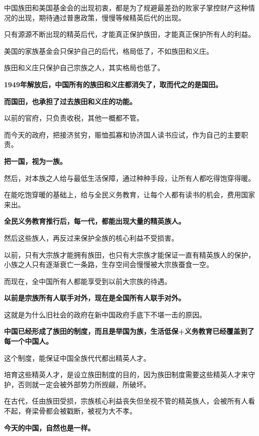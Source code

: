 \documentclass[UTF8, 11pt, oneside]{ctexart}
\newcommand{\zd}[1]{\textbf{\textcolor[RGB]{123,12,0}{#1}}} %
\begin{document}
中国族田和美国基金会的出现初衷，都是为了规避最差劲的败家子掌控财产这种情况的出现，期待通过普惠政策，慢慢等候精英后代的出现。

只有源源不断出现的精英后代，才能真正保护族田，才能真正保护所有人的利益。

美国的家族基金会只保护自己的后代，格局低了，不如族田和义庄。

族田和义庄只保护自己宗族之人，其实格局也低了。

\zd{1949年解放后，中国所有的族田和义庄都消失了，取而代之的是国田。}

\zd{而国田，也承担了过去族田和义庄的功能。}

以前的官府，只负责收税，其他一概都不管。

而今天的政府，把接济贫穷，赈恤孤寡和协济国人读书应试，作为自己的主要职责。

\zd{把一国，视为一族。}

然后，对本族之人给与最低生活保障，通过种种手段，让所有人都吃得饱穿得暖。

在能吃饱穿暖的基础上，给与全民义务教育，让每个人都有读书的机会，费用国家来出。

\zd{全民义务教育推行后，每一代，都能出现大量的精英族人。}

然后这些族人，再反过来保护全族的核心利益不受损害。

以前，只有大宗族才能拥有族田，也只有大宗族才能保证一直有精英族人的保护，小族之人只有逐渐衰亡一条路，生存空间会慢慢被大宗族蚕食一空。

而现在，全中国所有人都能享受到以前大宗族的待遇。

\zd{以前是宗族所有人联手对外，现在是全国所有人联手对外。}

这就是为什么旧社会的政府在新中国政府手底下不堪一击的原因。

\zd{中国已经形成了族田的制度，而且是举国为族，生活低保+义务教育已经覆盖到了每一个中国人。}

这个制度，能保证中国全族代代都出精英人才。

培育这些精英人才，是设立族田制度的目的，因为族田制度需要这些精英人才来守护，否则就一定会被外部势力所觊觎，所破坏。

在古代，任由族田受损，宗族核心利益丧失但坐视不管的精英族人，会被所有人看不起，脊梁骨都会被戳断，被视为大不孝。

\zd{今天的中国，自然也是一样。}
\end{document}

